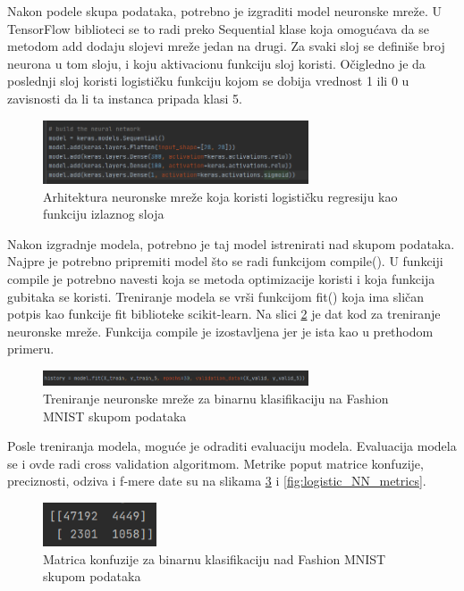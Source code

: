 \documentclass[a4paper,12pt]{report}
\begin{document}
Nakon podele skupa podataka, potrebno je izgraditi model neuronske mreže. U TensorFlow biblioteci se to radi preko Sequential klase koja omogućava da se metodom add dodaju slojevi mreže jedan na drugi. Za svaki sloj se definiše broj neurona u tom sloju, i koju aktivacionu funkciju sloj koristi. Očigledno je da poslednji sloj koristi logističku funkciju kojom se dobija vrednost 1 ili 0 u zavisnosti da li ta instanca pripada klasi 5.\\

\begin{figure}[h]
    \centering
    \includegraphics[width=0.7\textwidth]{model_logistic.png}
    \caption{Arhitektura neuronske mreže koja koristi logističku regresiju kao funkciju izlaznog sloja}\label{fig:model_logistic}
\end{figure}

Nakon izgradnje modela, potrebno je taj model istrenirati nad skupom podataka. Najpre je potrebno pripremiti model što se radi funkcijom compile(). U funkciji compile je potrebno navesti koja se metoda optimizacije koristi i koja funkcija gubitaka se koristi. Treniranje modela se vrši funkcijom fit() koja ima sličan potpis kao funkcije fit biblioteke scikit-learn. Na slici \ref{fig:model_compile_fit_NN} je dat kod za treniranje neuronske mreže. Funkcija compile je izostavljena jer je ista kao u prethodom primeru. \\

\begin{figure}[h]
    \centering
    \includegraphics[width=0.7\textwidth]{fit_logistic.png}
    \caption{Treniranje neuronske mreže za binarnu klasifikaciju na Fashion MNIST skupom podataka}\label{fig:model_compile_fit_NN}
\end{figure}

Posle treniranja modela, moguće je odraditi evaluaciju modela. Evaluacija modela se i ovde radi cross validation algoritmom. Metrike poput matrice konfuzije, preciznosti, odziva i f-mere date su na slikama \ref{fig:logistic_NN_confusion_matrix} i \ref{fig:logistic_NN_metrics}.\\

\begin{figure}[h]
    \centering
    \includegraphics[width=0.3\textwidth]{logistic_NN_confusion_matrix.png}
    \caption{Matrica konfuzije za binarnu klasifikaciju nad Fashion MNIST skupom podataka }\label{fig:logistic_NN_confusion_matrix}
\end{figure}
\end{document}
